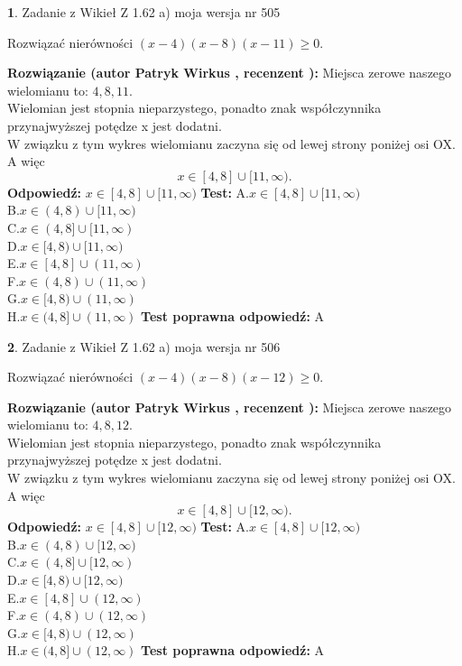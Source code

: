 \documentclass[12pt, a4paper]{article}
\theoremstyle{definition} %
\newtheorem{zad}{}
\newcommand{\zadStart}[1]{\begin{zad}#1\newline}
\newcommand{\zadStop}{\end{zad}}
\newcommand{\rozwStart}[2]{\noindent \textbf{Rozwiązanie (autor #1 , recenzent #2): }\newline}
\newcommand{\rozwStop}{\newline}
\newcommand{\odpStart}{\noindent \textbf{Odpowiedź:}\newline}
\newcommand{\odpStop}{\newline}
\newcommand{\testStart}{\noindent \textbf{Test:}\newline}
\newcommand{\testStop}{\newline}
\newcommand{\kluczStart}{\noindent \textbf{Test poprawna odpowiedź:}\newline}
\newcommand{\kluczStop}{\newline}
\begin{document}
\zadStart{Zadanie z Wikieł Z 1.62 a) moja wersja nr 505}

Rozwiązać nierówności $(x-4)(x-8)(x-11)\ge0$.
\zadStop
\rozwStart{Patryk Wirkus}{}
Miejsca zerowe naszego wielomianu to: $4, 8, 11$.\\
Wielomian jest stopnia nieparzystego, ponadto znak współczynnika przy\linebreak najwyższej potędze x jest dodatni.\\ W związku z tym wykres wielomianu zaczyna się od lewej strony poniżej osi OX. A więc $$x \in [4,8] \cup [11,\infty).$$
\rozwStop
\odpStart
$x \in [4,8] \cup [11,\infty)$
\odpStop
\testStart
A.$x \in [4,8] \cup [11,\infty)$\\
B.$x \in (4,8) \cup [11,\infty)$\\
C.$x \in (4,8] \cup [11,\infty)$\\
D.$x \in [4,8) \cup [11,\infty)$\\
E.$x \in [4,8] \cup (11,\infty)$\\
F.$x \in (4,8) \cup (11,\infty)$\\
G.$x \in [4,8) \cup (11,\infty)$\\
H.$x \in (4,8] \cup (11,\infty)$
\testStop
\kluczStart
A
\kluczStop



\zadStart{Zadanie z Wikieł Z 1.62 a) moja wersja nr 506}

Rozwiązać nierówności $(x-4)(x-8)(x-12)\ge0$.
\zadStop
\rozwStart{Patryk Wirkus}{}
Miejsca zerowe naszego wielomianu to: $4, 8, 12$.\\
Wielomian jest stopnia nieparzystego, ponadto znak współczynnika przy\linebreak najwyższej potędze x jest dodatni.\\ W związku z tym wykres wielomianu zaczyna się od lewej strony poniżej osi OX. A więc $$x \in [4,8] \cup [12,\infty).$$
\rozwStop
\odpStart
$x \in [4,8] \cup [12,\infty)$
\odpStop
\testStart
A.$x \in [4,8] \cup [12,\infty)$\\
B.$x \in (4,8) \cup [12,\infty)$\\
C.$x \in (4,8] \cup [12,\infty)$\\
D.$x \in [4,8) \cup [12,\infty)$\\
E.$x \in [4,8] \cup (12,\infty)$\\
F.$x \in (4,8) \cup (12,\infty)$\\
G.$x \in [4,8) \cup (12,\infty)$\\
H.$x \in (4,8] \cup (12,\infty)$
\testStop
\kluczStart
A
\kluczStop
\end{document}
